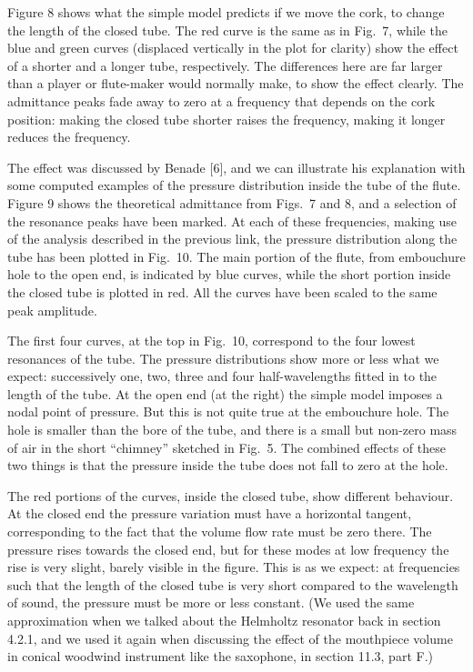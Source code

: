   Figure 8 shows what the simple model predicts if we move the cork, to change 
  the length of the closed tube. The red curve is the same as in Fig.\ 7, while 
  the blue and green curves (displaced vertically in the plot for clarity) show 
  the effect of a shorter and a longer tube, respectively. The differences here 
  are far larger than a player or flute-maker would normally make, to show the 
  effect clearly. The admittance peaks fade away to zero at a frequency that 
  depends on the cork position: making the closed tube shorter raises the 
  frequency, making it longer reduces the frequency. 

  The effect was discussed by Benade [6], and we can illustrate his explanation 
  with some computed examples of the pressure distribution inside the tube of 
  the flute. Figure 9 shows the theoretical admittance from Figs.\ 7 and 8, and 
  a selection of the resonance peaks have been marked. At each of these 
  frequencies, making use of the analysis described in the previous link, the 
  pressure distribution along the tube has been plotted in Fig.\ 10. The main 
  portion of the flute, from embouchure hole to the open end, is indicated by 
  blue curves, while the short portion inside the closed tube is plotted in 
  red. All the curves have been scaled to the same peak amplitude. 

  The first four curves, at the top in Fig.\ 10, correspond to the four lowest 
  resonances of the tube. The pressure distributions show more or less what we 
  expect: successively one, two, three and four half-wavelengths fitted in to 
  the length of the tube. At the open end (at the right) the simple model 
  imposes a nodal point of pressure. But this is not quite true at the 
  embouchure hole. The hole is smaller than the bore of the tube, and there is 
  a small but non-zero mass of air in the short “chimney” sketched in Fig.\ 5. 
  The combined effects of these two things is that the pressure inside the tube 
  does not fall to zero at the hole. 

  The red portions of the curves, inside the closed tube, show different 
  behaviour. At the closed end the pressure variation must have a horizontal 
  tangent, corresponding to the fact that the volume flow rate must be zero 
  there. The pressure rises towards the closed end, but for these modes at low 
  frequency the rise is very slight, barely visible in the figure. This is as 
  we expect: at frequencies such that the length of the closed tube is very 
  short compared to the wavelength of sound, the pressure must be more or less 
  constant. (We used the same approximation when we talked about the Helmholtz 
  resonator back in section 4.2.1, and we used it again when discussing the 
  effect of the mouthpiece volume in conical woodwind instrument like the 
  saxophone, in section 11.3, part F.) 

